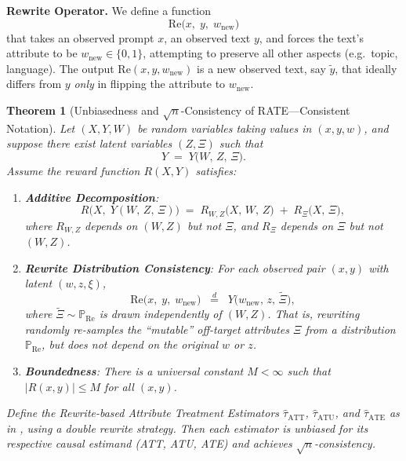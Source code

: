 \documentclass{article}
\newtheorem{theorem}{Theorem}[section]
\theoremstyle{definition}
\begin{document}
\bigskip

\noindent
\textbf{Rewrite Operator.}
We define a function
\[
\text{Re}\bigl(x,\;y,\;w_{\text{new}}\bigr)
\]
that takes an observed prompt \(x\), an observed text \(y\), and forces the text’s attribute to be \(w_{\text{new}}\in\{0,1\}\), attempting to preserve all other aspects (e.g.\ topic, language). The output \(\text{Re}(x,y,w_{\text{new}})\) is a new observed text, say \(\tilde{y}\), that ideally differs from \(y\) \emph{only} in flipping the attribute to \(w_{\text{new}}\).

\bigskip

\begin{theorem}[Unbiasedness and \(\sqrt{n}\)-Consistency of RATE---Consistent Notation]
\label{thm:unbiased_rate_consistent}
Let \((X, Y, W)\) be random variables taking values in \((x, y, w)\), and suppose there exist latent variables \((Z, \Xi)\) such that
\[
Y \;=\; Y\bigl(W,\,Z,\,\Xi\bigr).
\]
Assume the reward function \(R(X,Y)\) satisfies:

\begin{enumerate}
\item[\textbf{(A1)}] \textbf{Additive Decomposition}: 
\[
R\bigl(X,\;Y(W,\,Z,\,\Xi)\bigr)
\;=\;
R_{W,Z}\bigl(X,\,W,\,Z\bigr)
\;+\;
R_{\Xi}\bigl(X,\,\Xi\bigr),
\]
where \(R_{W,Z}\) depends on \((W,Z)\) but not \(\Xi\), and \(R_\Xi\) depends on \(\Xi\) but not \((W,Z)\).

\item[\textbf{(A2)}] \textbf{Rewrite Distribution Consistency}: For each observed pair \((x,y)\) with latent \((w,z,\xi)\),  
\[
\text{Re}\bigl(x,\;y,\;w_{\text{new}}\bigr)
\;\;\stackrel{d}{=}\;\;
Y\bigl(w_{\text{new}},\,z,\,\widetilde{\Xi}\bigr),
\]
where \(\widetilde{\Xi}\sim \mathbb{P}_{\mathrm{Re}}\) is drawn independently of \((W,Z)\).  That is, rewriting randomly re-samples the ``mutable'' off-target attributes \(\Xi\) from a distribution \(\mathbb{P}_{\mathrm{Re}}\), but does not depend on the original \(w\) or \(z\).

\item[\textbf{(A3)}] \textbf{Boundedness}: There is a universal constant \(M<\infty\) such that \(\bigl|R(x,y)\bigr|\le M\) for all \((x,y)\).
\end{enumerate}

Define the Rewrite-based Attribute Treatment Estimators \(\hat{\tau}_{\text{ATT}}\), \(\hat{\tau}_{\text{ATU}}\), and \(\hat{\tau}_{\text{ATE}}\) as in , using a \emph{double rewrite} strategy. Then each estimator is unbiased for its respective causal estimand (ATT, ATU, ATE) and achieves \(\sqrt{n}\)-consistency.
\end{theorem}
\end{document}
